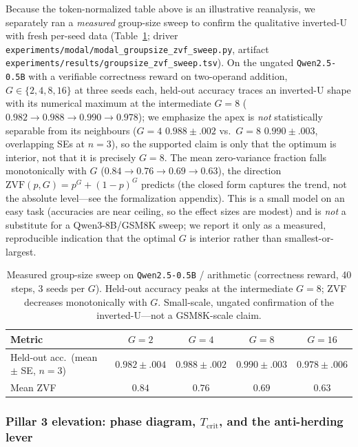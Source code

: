 \documentclass{article}
\begin{document}
Because the token-normalized table above is an illustrative reanalysis, we
separately ran a \emph{measured} group-size sweep to confirm the qualitative
inverted-U with fresh per-seed data (Table~\ref{tab:groupsize-measured};
driver \texttt{experiments/modal/modal\_groupsize\_zvf\_sweep.py}, artifact
\texttt{experiments/results/groupsize\_zvf\_sweep.tsv}). On the ungated
\texttt{Qwen2.5-0.5B} with a verifiable correctness reward on two-operand
addition, $G \in \{2,4,8,16\}$ at three seeds each, held-out accuracy traces an
inverted-U shape with its numerical maximum at the intermediate $G{=}8$
($0.982 \to 0.988 \to 0.990 \to 0.978$); we emphasize the apex is \emph{not}
statistically separable from its neighbours ($G{=}4$ $0.988{\pm}.002$ vs.\
$G{=}8$ $0.990{\pm}.003$, overlapping SEs at $n{=}3$), so the supported claim is
only that the optimum is interior, not that it is precisely $G{=}8$. The mean
zero-variance fraction falls monotonically with $G$ ($0.84 \to 0.76 \to 0.69 \to
0.63$), the direction $\mathrm{ZVF}(p,G)=p^{G}+(1-p)^{G}$ predicts (the closed
form captures the trend, not the absolute level---see the formalization
appendix). This is a small model on an easy task (accuracies are near ceiling,
so the effect sizes are modest) and is \emph{not} a substitute for a
Qwen3-8B/GSM8K sweep; we report it only as a measured, reproducible indication
that the optimal $G$ is interior rather than smallest-or-largest.

\begin{table}[ht]
\centering
\small
\begin{tabular}{lcccc}
\toprule
Metric & $G{=}2$ & $G{=}4$ & $G{=}8$ & $G{=}16$ \\
\midrule
Held-out acc.\ (mean $\pm$ SE, $n{=}3$) & $0.982{\pm}.004$ & $0.988{\pm}.002$ & $\mathbf{0.990}{\pm}.003$ & $0.978{\pm}.006$ \\
Mean ZVF & $0.84$ & $0.76$ & $0.69$ & $0.63$ \\
\bottomrule
\end{tabular}
\caption{Measured group-size sweep on \texttt{Qwen2.5-0.5B} / arithmetic
(correctness reward, 40 steps, 3 seeds per $G$). Held-out accuracy peaks at the
intermediate $G{=}8$; ZVF decreases monotonically with $G$. Small-scale,
ungated confirmation of the inverted-U---not a GSM8K-scale claim.}
\label{tab:groupsize-measured}
\end{table}
 

\subsubsection{Pillar 3 elevation: phase diagram, $T_\text{crit}$, and the anti-herding lever}
\label{sec:pillar3-iter23}
\end{document}
